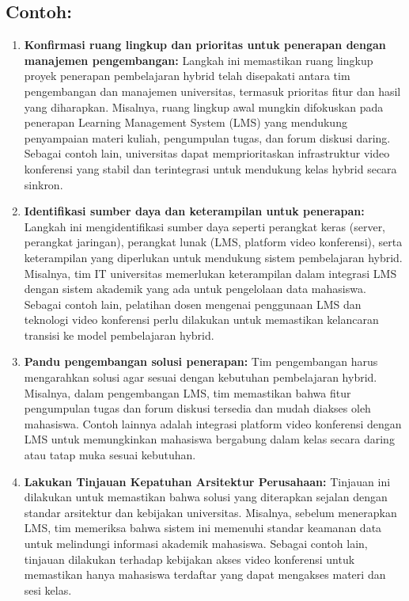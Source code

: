 \subsection*{Contoh:}

\begin{enumerate}
	\item \textbf{Konfirmasi ruang lingkup dan prioritas untuk penerapan dengan manajemen pengembangan:} 
	Langkah ini memastikan ruang lingkup proyek penerapan pembelajaran hybrid telah disepakati antara tim pengembangan dan manajemen universitas, termasuk prioritas fitur dan hasil yang diharapkan. Misalnya, ruang lingkup awal mungkin difokuskan pada penerapan Learning Management System (LMS) yang mendukung penyampaian materi kuliah, pengumpulan tugas, dan forum diskusi daring. Sebagai contoh lain, universitas dapat memprioritaskan infrastruktur video konferensi yang stabil dan terintegrasi untuk mendukung kelas hybrid secara sinkron.
	
	\item \textbf{Identifikasi sumber daya dan keterampilan untuk penerapan:} 
	Langkah ini mengidentifikasi sumber daya seperti perangkat keras (server, perangkat jaringan), perangkat lunak (LMS, platform video konferensi), serta keterampilan yang diperlukan untuk mendukung sistem pembelajaran hybrid. Misalnya, tim IT universitas memerlukan keterampilan dalam integrasi LMS dengan sistem akademik yang ada untuk pengelolaan data mahasiswa. Sebagai contoh lain, pelatihan dosen mengenai penggunaan LMS dan teknologi video konferensi perlu dilakukan untuk memastikan kelancaran transisi ke model pembelajaran hybrid.
	
	\item \textbf{Pandu pengembangan solusi penerapan:} 
	Tim pengembangan harus mengarahkan solusi agar sesuai dengan kebutuhan pembelajaran hybrid. Misalnya, dalam pengembangan LMS, tim memastikan bahwa fitur pengumpulan tugas dan forum diskusi tersedia dan mudah diakses oleh mahasiswa. Contoh lainnya adalah integrasi platform video konferensi dengan LMS untuk memungkinkan mahasiswa bergabung dalam kelas secara daring atau tatap muka sesuai kebutuhan.
	
	\item \textbf{Lakukan Tinjauan Kepatuhan Arsitektur Perusahaan:} 
	Tinjauan ini dilakukan untuk memastikan bahwa solusi yang diterapkan sejalan dengan standar arsitektur dan kebijakan universitas. Misalnya, sebelum menerapkan LMS, tim memeriksa bahwa sistem ini memenuhi standar keamanan data untuk melindungi informasi akademik mahasiswa. Sebagai contoh lain, tinjauan dilakukan terhadap kebijakan akses video konferensi untuk memastikan hanya mahasiswa terdaftar yang dapat mengakses materi dan sesi kelas.
	

\end{enumerate}
